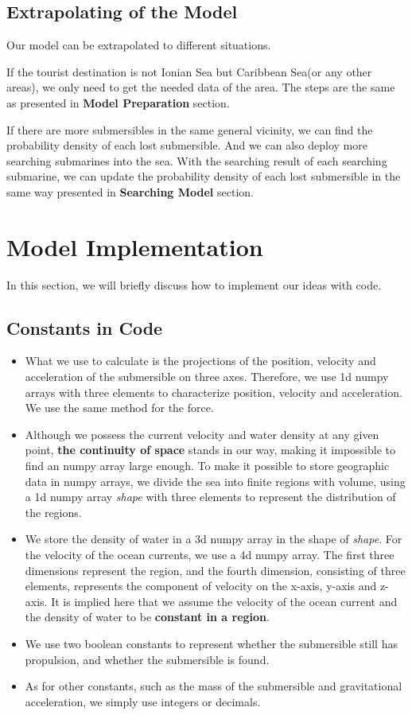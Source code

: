 \documentclass[12pt]{article}
\begin{document}
\subsection{Extrapolating of the Model}
Our model can be extrapolated to different situations.

If the tourist destination is not Ionian Sea but Caribbean Sea(or any other areas), we only need to get the needed data of the area. The steps are the same as presented in \textbf{Model Preparation} section.

If there are more submersibles in the same general vicinity, we can find the probability density of each lost submersible. And we can also deploy more searching submarines into the sea. With the searching result of each searching submarine, we can update the probability density of each lost submersible in the same way presented in \textbf{Searching Model} section.
\section{Model Implementation}
In this section, we will briefly discuss how to implement our ideas with code.
\subsection{Constants in Code}
\begin{itemize}
    \setlength{\itemsep}{1em}
    \item What we use to calculate is the projections of the position, velocity and acceleration of the submersible on three axes. Therefore, we use 1d numpy arrays with three elements to characterize position, velocity and acceleration. We use the same method for the force. 
    \item Although we possess the current velocity and water density at any given point, \textbf{the continuity of space} stands in our way, making it impossible to find an numpy array large enough. To make it possible to store geographic data in numpy arrays, we divide the sea into finite regions with volume, using a 1d numpy array \textit{shape} with three elements to represent the distribution of the regions.
    \item We store the density of water in a 3d numpy array in the shape of \textit{shape}. For the velocity of the ocean currents, we use a 4d numpy array. The first three dimensions represent the region, and the fourth dimension, consisting of three elements, represents the component of velocity on the x-axis, y-axis and z-axis. It is implied here that we assume the velocity of the ocean current and the density of water to be \textbf{constant in a region}.
    
    \item We use two boolean constants to represent whether the submersible still has propulsion, and whether the submersible is found.
    \item As for other constants, such as the mass of the submersible and gravitational acceleration, we simply use integers or decimals.
\end{itemize}
\end{document}
